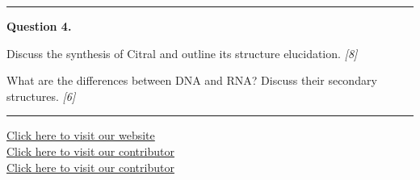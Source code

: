 \documentclass[11pt,a4paper]{article}
\newcommand{\pts}[1]{\hfill   \textit{[#1]}}
\begin{document}
\medskip\rule{\linewidth}{0.2pt}




\noindent   \textbf{Question 4.}

\begin{parts}
  \item Discuss the synthesis of Citral and outline its structure elucidation. \pts{8}
  \item What are the differences between DNA and RNA? Discuss their secondary structures. \pts{6}
\end{parts}

\vfill
\rule{\linewidth}{0.4pt}

\begin{center}\small
  \href{https://bhu-exam.vercel.app/}{Click here to visit our website}\\[4pt]
  \href{https://me-aryan.vercel.app/}{Click here to visit our contributor}\\[4pt]
  \href{https://quashan-me.vercel.app/}{Click here to visit our contributor}
\end{center}
\end{document}

